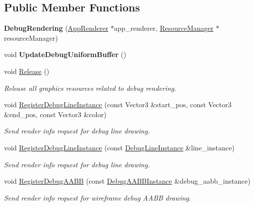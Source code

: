 \subsection*{Public Member Functions}
\begin{DoxyCompactItemize}
\item 
\mbox{\label{classDebugRendering_a04ef1665968e635ed878172cd43cd2ed}} 
{\bfseries Debug\+Rendering} (\hyperlink{classAppRenderer}{App\+Renderer} $\ast$app\+\_\+renderer, \hyperlink{classResourceManager}{Resource\+Manager} $\ast$resource\+Manager)
\item 
\mbox{\label{classDebugRendering_ab45f169c9f87018d13765d9949bba9c3}} 
void {\bfseries Update\+Debug\+Uniform\+Buffer} ()
\item 
\mbox{\label{classDebugRendering_ac6297a659a130d3e430c403faa608407}} 
void \hyperlink{classDebugRendering_ac6297a659a130d3e430c403faa608407}{Release} ()
\begin{DoxyCompactList}\small\item\em Release all graphics resources related to debug rendering. \end{DoxyCompactList}\item 
void \hyperlink{classDebugRendering_a4d86a142ed880456dbc732d213cc93e1}{Register\+Debug\+Line\+Instance} (const Vector3 \&start\+\_\+pos, const Vector3 \&end\+\_\+pos, const Vector3 \&color)
\begin{DoxyCompactList}\small\item\em Send render info request for debug line drawing. \end{DoxyCompactList}\item 
void \hyperlink{classDebugRendering_a9e23739719cbe569a0afefa6bb203330}{Register\+Debug\+Line\+Instance} (const \hyperlink{structDebugLineInstance}{Debug\+Line\+Instance} \&line\+\_\+instance)
\begin{DoxyCompactList}\small\item\em Send render info request for debug line drawing. \end{DoxyCompactList}\item 
void \hyperlink{classDebugRendering_a19e4cb443e7b0959dfd427431009acc4}{Register\+Debug\+A\+A\+BB} (const \hyperlink{structDebugAABBInstance}{Debug\+A\+A\+B\+B\+Instance} \&debug\+\_\+aabb\+\_\+instance)
\begin{DoxyCompactList}\small\item\em Send render info request for wireframe debug A\+A\+BB drawing. \end{DoxyCompactList}\item 

\end{DoxyCompactItemize}
